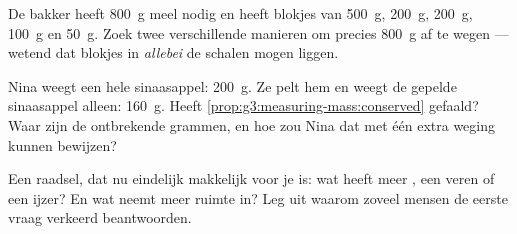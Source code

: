 \begin{exercise}[$\star$]\label{exo:g3:measuring-mass:9}
De bakker heeft \qty{800}{g} meel nodig en heeft blokjes van
\qty{500}{g}, \qty{200}{g}, \qty{200}{g}, \qty{100}{g} en
\qty{50}{g}. Zoek twee verschillende manieren om precies \qty{800}{g}
af te wegen --- wetend dat blokjes in \emph{allebei} de schalen mogen
liggen.
\end{exercise}

\begin{exercise}[$\star\star$]\label{exo:g3:measuring-mass:10}
Nina weegt een hele sinaasappel: \qty{200}{g}. Ze pelt hem en weegt de
gepelde sinaasappel alleen: \qty{160}{g}. Heeft
\cref{prop:g3:measuring-mass:conserved} gefaald? Waar zijn de
ontbrekende grammen, en hoe zou Nina dat met één extra weging kunnen
bewijzen?
\end{exercise}

\begin{exercise}[$\star\star$]\label{exo:g3:measuring-mass:11}
Een raadsel, dat nu eindelijk makkelijk voor je is: wat heeft meer
, een  veren of een  ijzer? En wat neemt meer
ruimte in? Leg uit waarom zoveel mensen de eerste vraag verkeerd
beantwoorden.
\end{exercise}
